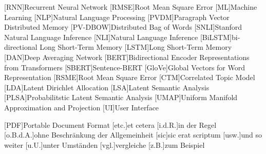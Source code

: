 \begin{acronym}[XXXXXX]
    [RNN]{Recurrent Neural Network}
    [RMSE]{Root Mean Square Error}
    [ML]{Machine Learning}
    [NLP]{Natural Language Processing}
    [PVDM]{Paragraph Vector Distributed Memory}
    [PV-DBOW]{Distributed Bag of Words}
    [SNLI]{Stanford Natural Language Inference}
    [NLI]{Natural Language Inference}
    [BiLSTM]{bi-directional Long Short-Term Memory}
    [LSTM]{Long Short-Term Memory}
    [DAN]{Deep Averaging Network}
    [BERT]{Bidirectional Encoder Representations from Transformers}
    [SBERT]{Sentence-BERT}
    [GloVe]{Global Vectors for Word Representation}
    [RSME]{Root Mean Square Error}
    [CTM]{Correlated Topic Model}
    [LDA]{Latent Dirichlet Allocation}
    [LSA]{Latent Semantic Analysis}
    [PLSA]{Probabilitstic Latent Semantic Analysis}
    [UMAP]{Uniform Manifold Approximation and Projection}
    [UI]{User Interface}


    \vspace{\parskip}

    [PDF]{Portable Document Format}
    [etc.]{et cetera}
    [i.d.R.]{in der Regel}
    [o.B.d.A.]{ohne Beschränkung der Allgemeinheit}
    [sic]{sic erat scriptum}
    [usw.]{und so weiter}
    [u.U.]{unter Umständen}
    [vgl.]{vergleiche}
    [z.B.]{zum Beispiel}
\end{acronym}
